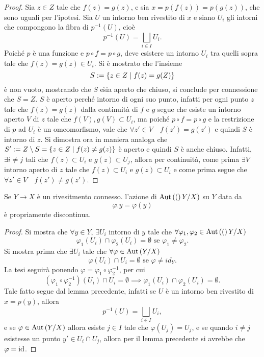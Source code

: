 \documentclass[]{article}
\begin{document}
\begin{proof}
    Sia $z \in Z$ tale che $f(z) = g(z)$, e sia $x = p(f(z)) = p(g(z))$, che sono uguali per l'ipotesi. \nl
    Sia $U$ un intorno ben rivestito di $x$ e siano $U_i$ gli intorni che compongono la fibra di $p^{-1}(U)$, cio\`e
    \[
        p^{-1}(U) = \bigsqcup_{i \in I} U_i.
    \]
    Poich\'e $p$ \`e una funzione e $p \circ f = p \circ g$, deve esistere un intorno $U_i$ tra quelli sopra tale che $f(z) = g(z) \in U_i$. \nl
    Si \`e mostrato che l'insieme
    \[S := \left\{ z \in Z \mid f(z) = g(Z) \right\}\]
    \`e non vuoto, mostrando che $S$ e\` sia aperto che chiuso, si conclude per connessione che $S = Z$. \nl
    $S$ \`e aperto perch\'e intorno di ogni suo punto, infatti per ogni punto $z$ tale che $f(z) = g(z)$ dalla continuit\`a di $f$ e $g$ segue che
    esiste un intorno aperto $V$ di $z$ tale che $f(V), g(V) \subset U_i$, ma poich\'e $p \circ f = p \circ g$ e
    la restrizione di $p$ ad $U_i$ \`e un omeomorfismo, vale che $\forall z' \in V \quad f(z') = g(z')$ e quindi $S$ \`e intorno di $z$.
    Si dimostra ora in maniera analoga che $S' := Z \setminus S = \left\{ z \in Z \mid f(z) \neq g(z) \right\}$ \`e aperto e quindi $S$ \`e anche chiuso. \nl
    Infatti, $\exists i \neq j$ tali che $f(z) \subset U_i$ e $g(z) \subset U_j$, allora per continuit\`a, come prima
    $\exists V$ intorno aperto di $z$ tale che $f(z) \subset U_i$ e $g(z) \subset U_i$ e come prima
    segue che $\forall z' \in V \quad f(z') \neq g(z')$. 
\end{proof}

\begin{proposition}  \nl
    Se $Y \to X$ \`e un rivesitmento connesso. l'azione di $\mathrm{Aut}\left((\right)Y/X)$ su $Y$ data da
    \[ \varphi.y = \varphi(y)\]
    \`e propriamente discontinua.
\end{proposition}

\begin{proof}
    Si mostra che $\forall y \in Y$, $\exists U_i$ intorno di $y$ tale che $\forall \varphi_1, \varphi_2 \in \mathrm{Aut}\left((\right)Y/X)$
    \[
        \varphi_1(U_i) \cap \varphi_2(U_i) = \emptyset \text{ se } \varphi_1 \neq \varphi_2.
    \] 
    Si mostra prima che $\exists U_i$ tale che $\forall \varphi \in \mathrm{Aut}\left(Y/X\right)$
    \[
        \varphi(U_i) \cap U_i = \emptyset \text{ se } \varphi \neq id_Y.
    \]
    La tesi seguir\`a ponendo $\varphi = \varphi_1 \circ \varphi_2^{-1}$, per cui
    \[
        \left(\varphi_1 \circ \varphi_2^{-1}\right)(U_i) \cap U_i = \emptyset \implies \varphi_1(U_i) \cap \varphi_2(U_i) = \emptyset.
    \]
    Tale fatto segue dal lemma precedente, infatti se $U$ \`e un intorno ben rivestito di $x = p(y)$, allora
    \[
        p^{-1}(U) = \bigsqcup_{i \in I} U_i,
    \]
    e se $\varphi \in \mathrm{Aut}\left(Y/X\right)$ allora esiste $j \in I$ tale che $\varphi(U_j) = U_j$, e se quando $i \neq j$ esistesse
    un punto $y' \in U_i \cap U_j$, allora per il lemma precedente si avrebbe che $\varphi = \mathrm{id}$. \nl
\end{proof}
\end{document}
